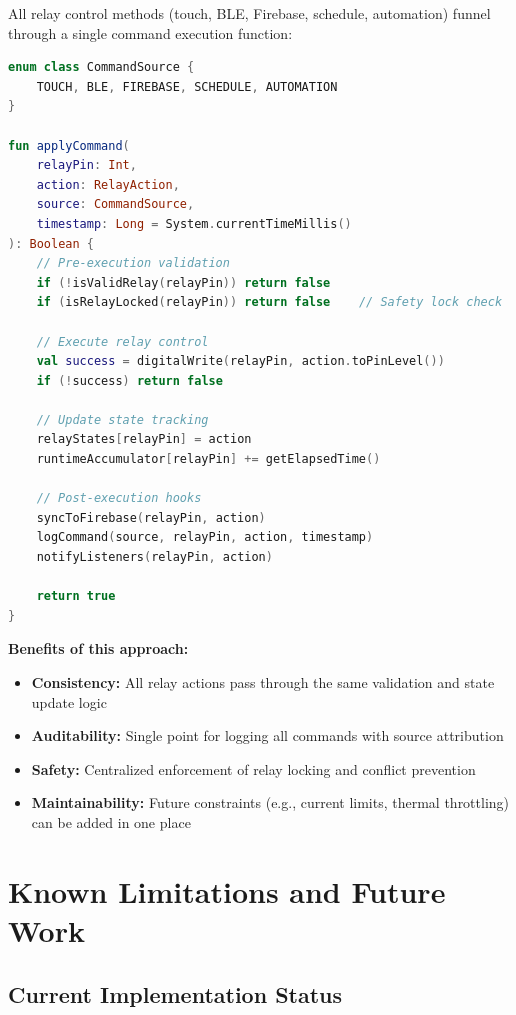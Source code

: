 All relay control methods (touch, BLE, Firebase, schedule, automation) funnel through a single command execution function:

\begin{lstlisting}[language=Kotlin, caption=Unified Command Execution Funnel, label=lst:execute_command]
enum class CommandSource {
    TOUCH, BLE, FIREBASE, SCHEDULE, AUTOMATION
}

fun applyCommand(
    relayPin: Int,
    action: RelayAction,
    source: CommandSource,
    timestamp: Long = System.currentTimeMillis()
): Boolean {
    // Pre-execution validation
    if (!isValidRelay(relayPin)) return false
    if (isRelayLocked(relayPin)) return false    // Safety lock check
    
    // Execute relay control
    val success = digitalWrite(relayPin, action.toPinLevel())
    if (!success) return false
    
    // Update state tracking
    relayStates[relayPin] = action
    runtimeAccumulator[relayPin] += getElapsedTime()
    
    // Post-execution hooks
    syncToFirebase(relayPin, action)
    logCommand(source, relayPin, action, timestamp)
    notifyListeners(relayPin, action)
    
    return true
}
\end{lstlisting}

\textbf{Benefits of this approach:}
\begin{itemize}
    \item \textbf{Consistency:} All relay actions pass through the same validation and state update logic
    \item \textbf{Auditability:} Single point for logging all commands with source attribution
    \item \textbf{Safety:} Centralized enforcement of relay locking and conflict prevention
    \item \textbf{Maintainability:} Future constraints (e.g., current limits, thermal throttling) can be added in one place
\end{itemize}

\section{Known Limitations and Future Work}

\subsection{Current Implementation Status}

